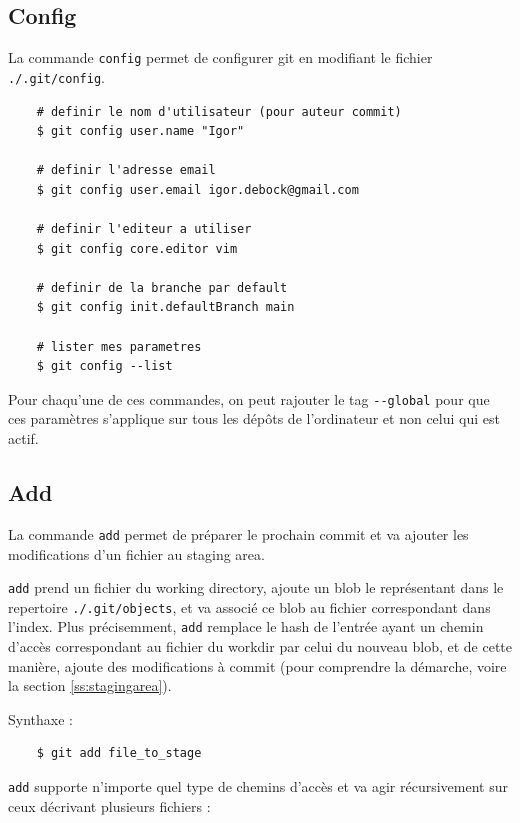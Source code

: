 \documentclass[a4paper, 12pt]{article}
\begin{document}
    \subsection{Config}
    La commande \lstinline{config} permet de configurer git en modifiant le
    fichier \lstinline{./.git/config}.

    \begin{lstlisting}
    # definir le nom d'utilisateur (pour auteur commit)
    $ git config user.name "Igor"
    
    # definir l'adresse email
    $ git config user.email igor.debock@gmail.com

    # definir l'editeur a utiliser
    $ git config core.editor vim

    # definir de la branche par default
    $ git config init.defaultBranch main

    # lister mes parametres 
    $ git config --list
    \end{lstlisting}

    Pour chaqu'une de ces commandes, on peut rajouter le tag
    \lstinline{--global} pour que ces paramètres s'applique sur tous les
    dépôts de l'ordinateur et non celui qui est actif.

    \subsection{Add}\label{git:add}

    La commande \lstinline{add} permet de préparer le prochain commit et va
    ajouter les modifications d'un fichier au staging area.

    \lstinline{add} prend un fichier du working directory, ajoute un blob le
    représentant dans le repertoire \lstinline{./.git/objects}, et va associé ce
    blob au fichier correspondant dans l'index. Plus précisemment,
    \lstinline{add} remplace le hash de l'entrée ayant un chemin d'accès
    correspondant au fichier du workdir par celui du nouveau blob, et de cette
    manière, ajoute des modifications à commit (pour comprendre la démarche,
    voire la section \ref{ss:stagingarea}).

    \noindent Synthaxe :
    \begin{lstlisting}
    $ git add file_to_stage
    \end{lstlisting}

    \noindent \lstinline{add} supporte n'importe quel type de chemins d'accès et
    va agir récursivement sur ceux décrivant plusieurs fichiers :
\end{document}
